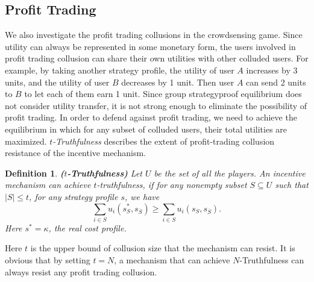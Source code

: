 \documentclass[conference]{IEEEtran}
\newtheorem{definition}{Definition}
\theoremstyle{definition}
\begin{document}
\subsection{Profit Trading}
\label{subsec:pt}
We also investigate the profit trading collusions in the crowdsensing game. Since utility can always be represented in some monetary form, the users involved in profit trading collusion can share their own utilities with other colluded users. For example, by taking another strategy profile, the utility of user $A$ increases by 3 units, and the utility of user $B$ decreases by 1 unit. Then user $A$ can send 2 units to $B$ to let each of them earn 1 unit. Since group strategyproof equilibrium does not consider utility transfer, 
it is not strong enough to eliminate the possibility of profit trading. In order to defend against profit trading, we need to achieve the equilibrium in which for any subset of colluded users, their total utilities are maximized. \emph{$t$-Truthfulness} \cite{goldberg2005collusion} describes the extent of profit-trading collusion resistance of the incentive mechanism.
\begin{definition}
\label{def:tt}
\textbf{($t$-Truthfulness)} Let $U$ be the set of all the players. An incentive mechanism can achieve $t$-truthfulness, if for any nonempty subset $S\subseteq U$ such that $|S|\leq t$, for any strategy profile $s$, we have
\begin{equation}
\sum_{i\in S} u_i(s_S^*,s_{\overline{S}})\geq \sum_{i\in S} u_i(s_S,s_{\overline{S}}).
\end{equation}
Here $s^*=\kappa$, the real cost profile.
\end{definition}
Here $t$ is the upper bound of collusion size that the mechanism can resist. It is obvious that by setting $t=N$, a mechanism that can achieve $N$-Truthfulness can always resist any profit trading collusion. 
\end{document}
